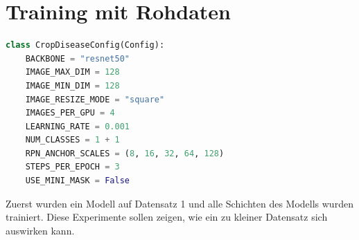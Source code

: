 \section{Training mit Rohdaten}\label{sub:sub:sec:experiment-1}

\begin{lstlisting}[language=python,caption={Konfiguration für Experimente 1},captionpos=b]
class CropDiseaseConfig(Config):
    BACKBONE = "resnet50"
    IMAGE_MAX_DIM = 128
    IMAGE_MIN_DIM = 128
    IMAGE_RESIZE_MODE = "square"
    IMAGES_PER_GPU = 4
    LEARNING_RATE = 0.001
    NUM_CLASSES = 1 + 1
    RPN_ANCHOR_SCALES = (8, 16, 32, 64, 128)
    STEPS_PER_EPOCH = 3
    USE_MINI_MASK = False
\end{lstlisting}
\noindent
Zuerst wurden ein Modell auf Datensatz 1 und alle Schichten des Modells wurden trainiert. Diese Experimente sollen zeigen, wie ein zu kleiner Datensatz sich auswirken kann.

